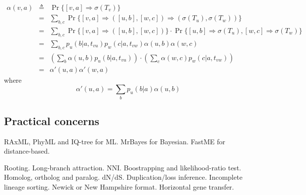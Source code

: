 \documentclass[10pt]{article}
\begin{document}
\begin{eqnarray*}
\alpha(v,a)&\triangleq&\Pr\{[v,a]\Rightarrow\sigma(T_v)\}\\
&=&\sum_{b,c}\Pr\big\{[v,a]\Rightarrow([u,b],[w,c])\Rightarrow(\sigma(T_u),\sigma(T_w))\big\}\\
&=&\sum_{b,c}\Pr\big\{[v,a]\Rightarrow([u,b],[w,c])\big\}\cdot\Pr\big\{[u,b]\Rightarrow\sigma(T_u),[w,c]\Rightarrow\sigma(T_w)\big\}\\
&=&\sum_{b,c}p_u(b|a,t_{vu})p_w(c|a,t_{vw})\alpha(u,b)\alpha(w,c)\\
&=&\left(\sum_b \alpha(u,b)p_u(b|a,t_{vu})\right)\cdot\left(\sum_c \alpha(w,c)p_w(c|a,t_{vw})\right)\\
&=&\alpha'(u,a)\alpha'(w,a)
\end{eqnarray*}
where
$$ \alpha'(u,a)=\sum_b p_u(b|a)\alpha(u,b) $$

\subsection{Practical concerns}

RAxML, PhyML and IQ-tree for ML. MrBayes for Bayesian. FastME for
distance-based.

Rooting. Long-branch attraction. NNI. Boostrapping and likelihood-ratio test.
Homolog, ortholog and paralog. dN/dS.  Duplication/loss inference. Incomplete
lineage sorting. Newick or New Hampshire format. Horizontal gene transfer.
\end{document}

